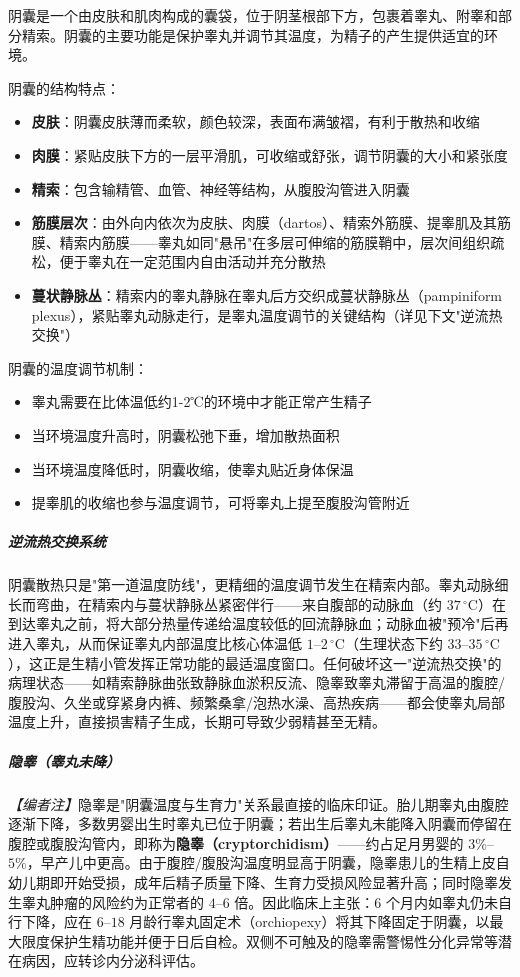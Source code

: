 阴囊是一个由皮肤和肌肉构成的囊袋，位于阴茎根部下方，包裹着睾丸、附睾和部分精索。阴囊的主要功能是保护睾丸并调节其温度，为精子的产生提供适宜的环境。

阴囊的结构特点：
\begin{itemize}
    \item \textbf{皮肤}：阴囊皮肤薄而柔软，颜色较深，表面布满皱褶，有利于散热和收缩
    \item \textbf{肉膜}：紧贴皮肤下方的一层平滑肌，可收缩或舒张，调节阴囊的大小和紧张度
    \item \textbf{精索}：包含输精管、血管、神经等结构，从腹股沟管进入阴囊
    \item \textbf{筋膜层次}：由外向内依次为皮肤、肉膜（dartos）、精索外筋膜、提睾肌及其筋膜、精索内筋膜——睾丸如同"悬吊"在多层可伸缩的筋膜鞘中，层次间组织疏松，便于睾丸在一定范围内自由活动并充分散热
    \item \textbf{蔓状静脉丛}：精索内的睾丸静脉在睾丸后方交织成蔓状静脉丛（pampiniform plexus），紧贴睾丸动脉走行，是睾丸温度调节的关键结构（详见下文"逆流热交换"）
\end{itemize}

阴囊的温度调节机制：
\begin{itemize}
    \item 睾丸需要在比体温低约1-2℃的环境中才能正常产生精子
    \item 当环境温度升高时，阴囊松弛下垂，增加散热面积
    \item 当环境温度降低时，阴囊收缩，使睾丸贴近身体保温
    \item 提睾肌的收缩也参与温度调节，可将睾丸上提至腹股沟管附近
\end{itemize}

\subparagraph{逆流热交换系统}

阴囊散热只是"第一道温度防线"，更精细的温度调节发生在精索内部。睾丸动脉细长而弯曲，在精索内与蔓状静脉丛紧密伴行——来自腹部的动脉血（约 $37\,^{\circ}\mathrm{C}$）在到达睾丸之前，将大部分热量传递给温度较低的回流静脉血；动脉血被"预冷"后再进入睾丸，从而保证睾丸内部温度比核心体温低 $1$--$2\,^{\circ}\mathrm{C}$（生理状态下约 $33$--$35\,^{\circ}\mathrm{C}$），这正是生精小管发挥正常功能的最适温度窗口。任何破坏这一"逆流热交换"的病理状态——如精索静脉曲张致静脉血淤积反流、隐睾致睾丸滞留于高温的腹腔/腹股沟、久坐或穿紧身内裤、频繁桑拿/泡热水澡、高热疾病——都会使睾丸局部温度上升，直接损害精子生成，长期可导致少弱精甚至无精。

\subparagraph{隐睾（睾丸未降）}

\noindent\textit{【编者注】}隐睾是"阴囊温度与生育力"关系最直接的临床印证。胎儿期睾丸由腹腔逐渐下降，多数男婴出生时睾丸已位于阴囊；若出生后睾丸未能降入阴囊而停留在腹腔或腹股沟管内，即称为\textbf{隐睾（cryptorchidism）}——约占足月男婴的 $3\%$--$5\%$，早产儿中更高。由于腹腔/腹股沟温度明显高于阴囊，隐睾患儿的生精上皮自幼儿期即开始受损，成年后精子质量下降、生育力受损风险显著升高；同时隐睾发生睾丸肿瘤的风险约为正常者的 $4$--$6$ 倍。因此临床上主张：$6$ 个月内如睾丸仍未自行下降，应在 $6$--$18$ 月龄行睾丸固定术（orchiopexy）将其下降固定于阴囊，以最大限度保护生精功能并便于日后自检。双侧不可触及的隐睾需警惕性分化异常等潜在病因，应转诊内分泌科评估。

